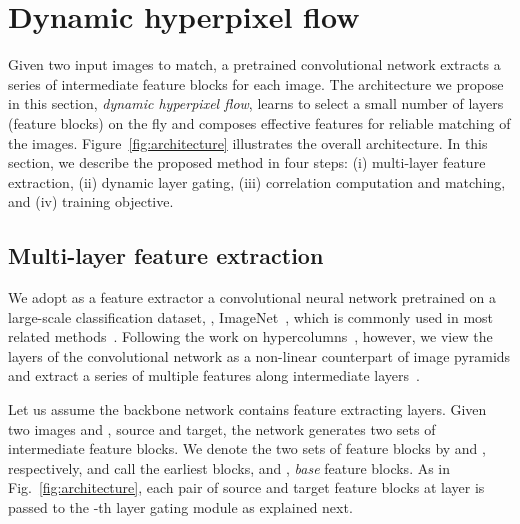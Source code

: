 \documentclass[runningheads]{llncs}
\begin{document}
\section{Dynamic hyperpixel flow}
\label{methods}
Given two input images to match, a pretrained convolutional network extracts a series of intermediate feature blocks for each image. The architecture we propose in this section, {\em dynamic hyperpixel flow}, learns to select a small number of layers (feature blocks) on the fly and composes effective features for reliable matching of the images. Figure~\ref{fig:architecture} illustrates the overall architecture.  
In this section, we describe the proposed method in four steps: (i) multi-layer feature extraction, (ii) dynamic layer gating, (iii) correlation computation and matching, and (iv) training objective.

\begin{figure*}[t]
    \begin{center}

    \caption{The overall architecture of Dynamic Hyperpixel Flow (DHPF).}
    \label{fig:architecture}
    \end{center}    
\end{figure*}

\subsection{Multi-layer feature extraction}

We adopt as a feature extractor a convolutional neural network pretrained on a large-scale classification dataset, \eg, ImageNet~\cite{deng2009imagenet}, which is commonly used in most related methods~\cite{choy2016universal,han2017scnet,kim2018recurrent,kim2017dctm,lee2019sfnet,min2019hyperpixel,rocco17geocnn,rocco18weak,rocco2018neighbourhood,paul2018attentive,huang2019dynamic}. 
Following the work on hypercolumns~\cite{hariharan2015hypercolumns}, however, we view the layers of the convolutional network as a non-linear counterpart of image pyramids and extract a series of multiple features along intermediate layers~\cite{min2019hyperpixel}.  

Let us assume the backbone network contains  feature extracting layers. 
Given two images  and , source and target, the network generates two sets of  intermediate feature blocks. 
We denote the two sets of feature blocks by  and  , respectively, and call the earliest blocks,  and , {\em base} feature blocks.
As in Fig.~\ref{fig:architecture}, each pair of source and target feature blocks at layer  is passed to the -th layer gating module as explained next. 
\end{document}
